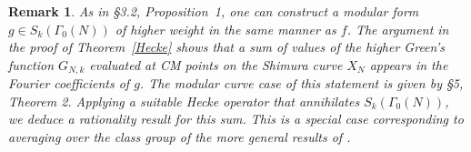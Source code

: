 \documentclass[a4paper,12pt]{article}
\newtheorem{remark}[theorem]{Remark}
\begin{document}
\begin{remark} 
 As in \cite{GrossKohnenZagier87} \S3.2, Proposition~1, one can construct a modular form 
$ g \in S_k(\Gamma_0(N))$ of higher weight in the same manner as \( f \). 
The argument in the proof of Theorem~\ref{Hecke} shows that a sum of values of the higher Green's function $G_{N,k}$ evaluated at CM points on the Shimura curve  $X_N$  appears in the Fourier coefficients of $g$. The modular curve case of this statement is given by \cite{GrossKohnenZagier87} \S5, Theorem 2. 
Applying a suitable Hecke operator that annihilates $S_k(\Gamma_0(N))$, we deduce a rationality result for this sum. 
This is a special case corresponding to averaging over the class group of the more general results of \cite{Li_higher_green_function}.

\end{remark}
\end{document}
